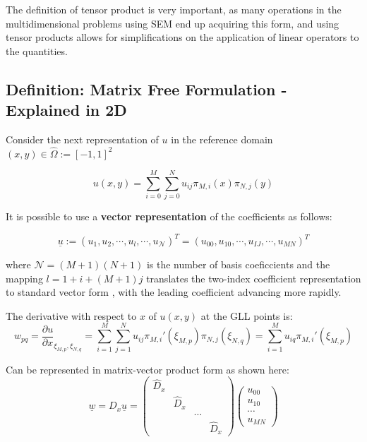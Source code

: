 \documentclass[
]{scrartcl}
\begin{document}
The definition of tensor product is very important, as many operations
in the multidimensional problems using SEM end up acquiring this form,
and using tensor products allows for simplifications on the application
of linear operators to the quantities.

\hypertarget{definition-matrix-free-formulation---explained-in-2d}{%
\subsection{Definition: Matrix Free Formulation - Explained in
2D}\label{definition-matrix-free-formulation---explained-in-2d}}

Consider the next representation of \(u\) in the reference
domain\((x,y) \in \hat{\Omega}:=[-1,1]^{2}\)

\begin{equation}
    u(x,y)=\sum_{i=0}^{M}\sum_{j=0}^{N} u_{ij} \pi_{M,i}(x) \pi_{N,j}(y) 
\end{equation}

It is possible to use a \textbf{vector representation} of the
coefficients as follows:

\begin{equation}
    \underline{u} := (u_1,u_2,\cdots,u_l,\cdots,u_{\mathcal{N}})^{T}=(u_{00},u_{10},\cdots,u_{IJ},\cdots,u_{MN})^{T} 
\end{equation}

where \(\mathcal{N}=(M+1)(N+1)\) is the number of basis coeficcients and
the mapping \(l=1+i+(M+1)j\) translates the two-index coefficient
representation to standard vector form , with the leading coefficient
advancing more rapidly.

The derivative with respect to \(x\) of \(u(x,y)\) at the GLL points is:
\begin{equation}
    w_{pq}=\frac{\partial u}{\partial x}_{\xi_{M,p},\xi_{N,q}}=\sum_{i=1}^{M}\sum_{j=1}^{N} u_{ij} \pi_{M,i}'(\xi_{M,p}) \pi_{N,j}(\xi_{N,q})= \sum_{i=1}^{M} u_{iq} \pi_{M,i}'(\xi_{M,p})
\end{equation}

Can be represented in matrix-vector product form as shown here:
\begin{equation}
    \underline{w}=D_x\underline{u}=
    \begin{pmatrix}
    \hat{D}_x &           &        & \\
              & \hat{D}_x &        & \\
              &           & \cdots & \\
              &           &        & \hat{D}_x
    \end{pmatrix} 
    \begin{pmatrix}
    u_{00} \\
    u_{10} \\
    \cdots \\
    u_{MN}
    \end{pmatrix}
\end{equation}
\end{document}
